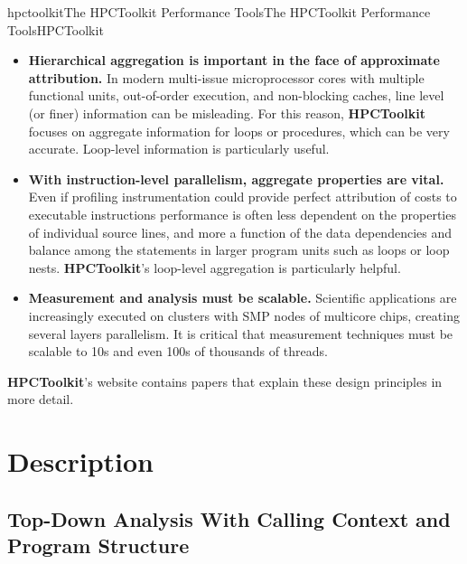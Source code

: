 \documentclass[english]{article}
\begin{document}
\begin{Name}{1}{hpctoolkit}{The HPCToolkit Performance Tools}{The HPCToolkit Performance Tools}{HPCToolkit}
\begin{itemize}
\item \textbf{Hierarchical aggregation is important in the face of approximate attribution.} 
In modern multi-issue microprocessor cores with multiple functional units, out-of-order execution, and non-blocking caches, line level (or finer) information can be misleading.
For this reason, \textbf{HPCToolkit} focuses on aggregate information for loops or procedures, which can be very accurate.
Loop-level information is particularly useful.

\item \textbf{With instruction-level parallelism, aggregate properties are vital.}
Even if profiling instrumentation could provide perfect attribution of costs to executable instructions performance is often less dependent on the properties of individual source lines, and more a function of the data dependencies and balance among the statements in larger program units such as loops or loop nests.
\textbf{HPCToolkit}'s loop-level aggregation is particularly helpful.

\item \textbf{Measurement and analysis must be scalable.}
Scientific applications are increasingly executed on clusters with SMP nodes of multicore chips, creating several layers parallelism. 
It is critical that measurement techniques must be scalable to 10s and even 100s of thousands of threads. 

\end{itemize}

\textbf{HPCToolkit}'s website contains papers that explain these design principles in more detail.

\end{Name}

\section{Description}

\subsection{Top-Down Analysis With Calling Context and Program Structure}
\end{document}

